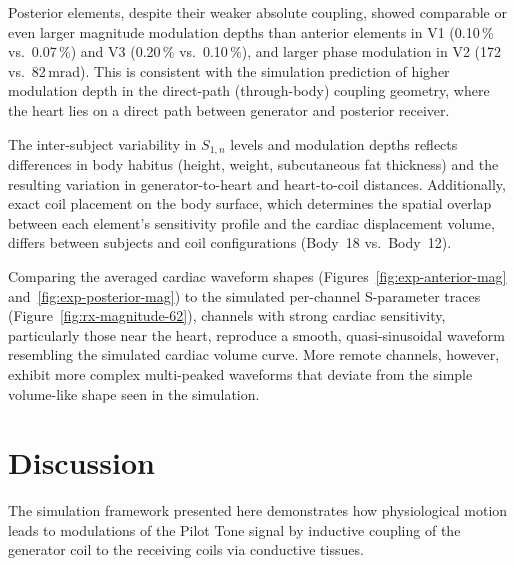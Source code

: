 \documentclass[
]{article}
\begin{document}
Posterior elements, despite their weaker absolute coupling, showed comparable or even larger magnitude modulation depths than anterior elements in V1 (0.10\,\% vs.\ 0.07\,\%) and V3 (0.20\,\% vs.\ 0.10\,\%), and larger phase modulation in V2 (172 vs.\ 82\,mrad). This is consistent with the simulation prediction of higher modulation depth in the direct-path (through-body) coupling geometry, where the heart lies on a direct path between generator and posterior receiver.

The inter-subject variability in $S_{1,n}$ levels and modulation depths reflects differences in body habitus (height, weight, subcutaneous fat thickness) and the resulting variation in generator-to-heart and heart-to-coil distances. Additionally, exact coil placement on the body surface, which determines the spatial overlap between each element's sensitivity profile and the cardiac displacement volume, differs between subjects and coil configurations (Body~18 vs.\ Body~12).

Comparing the averaged cardiac waveform shapes (Figures~\ref{fig:exp-anterior-mag} and~\ref{fig:exp-posterior-mag}) to the simulated per-channel S-parameter traces (Figure~\ref{fig:rx-magnitude-62}), channels with strong cardiac sensitivity, particularly those near the heart, reproduce a smooth, quasi-sinusoidal waveform resembling the simulated cardiac volume curve. More remote channels, however, exhibit more complex multi-peaked waveforms that deviate from the simple volume-like shape seen in the simulation.

\section{Discussion}\label{discussion}

The simulation framework presented here demonstrates how
physiological motion leads to modulations of the Pilot Tone signal by
inductive coupling of the generator coil to the receiving coils via
conductive tissues.
\end{document}
